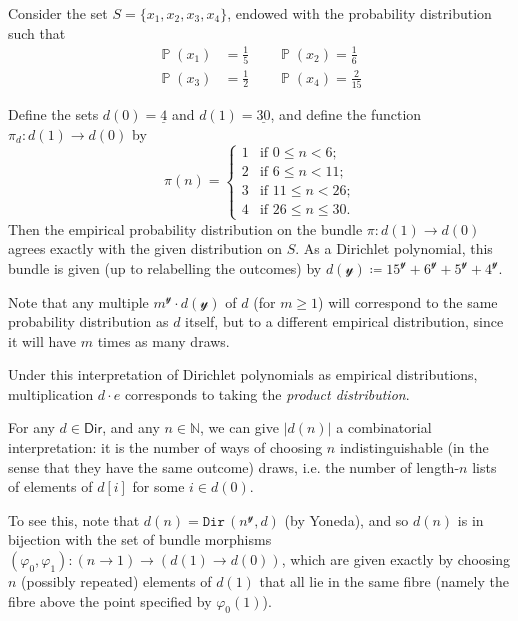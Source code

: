 \documentclass[11pt,fleqn]{article}
\renewcommand{\leq}{\leqslant}
\renewcommand{\geq}{\geqslant}
\newcommand{\yon}{\mathcal{y}}
\newcommand{\cat}[1]{\mathtt{#1}}
\newcommand{\rig}[1]{\mathsf{#1}}
\newcommand{\Dir}{\rig{Dir}}
\newcommand{\cDir}{\cat{Dir}}
\DeclareMathOperator{\prob}{\mathbb{P}}
\begin{document}
\begin{example}
  Consider the set $S=\{x_1,x_2,x_3,x_4\}$, endowed with the probability distribution such that
  \[
    \begin{aligned}
      \prob(x_1) &= \frac{1}{5}
      \qquad\prob(x_2) = \frac{1}{6}
    \\\prob(x_3) &= \frac{1}{2}
      \qquad\prob(x_4) = \frac{2}{15}
    \end{aligned}
  \]

  Define the sets $d(0)=\underline{4}$ and $d(1)=\underline{30}$, and define the function $\pi_d\colon d(1)\to d(0)$ by
  \[
    \pi(n) =
    \begin{cases}
      1 &\mbox{if $0\leq n<6$;}
    \\2 &\mbox{if $6\leq n<11$;}
    \\3 &\mbox{if $11\leq n<26$;}
    \\4 &\mbox{if $26\leq n\leq30$.}
    \end{cases}
  \]
  Then the empirical probability distribution on the bundle $\pi\colon d(1)\to d(0)$ agrees exactly with the given distribution on $S$.
  As a Dirichlet polynomial, this bundle is given (up to relabelling the outcomes) by $d(\yon)\coloneqq15^\yon+6^\yon+5^\yon+4^\yon$.

  Note that any multiple $m^\yon\cdot d(\yon)$ of $d$ (for $m\geq1$) will correspond to the same probability distribution as $d$ itself, but to a different empirical distribution, since it will have $m$ times as many draws.
\end{example}

Under this interpretation of Dirichlet polynomials as empirical distributions, multiplication $d\cdot e$ corresponds to taking the \emph{product distribution}.

\begin{remark}
  For any $d\in\Dir$, and any $n\in\mathbb{N}$, we can give $|d(n)|$ a combinatorial interpretation: it is the number of ways of choosing $n$ indistinguishable (in the sense that they have the same outcome) draws, i.e. the number of length-$n$ lists of elements of $d[i]$ for some $i\in d(0)$.

  To see this, note that $d(n)=\cDir\,(n^\yon,d)$ (by Yoneda), and so $d(n)$ is in bijection with the set of bundle morphisms $(\varphi_0,\varphi_1)\colon(n\to1)\to(d(1)\to d(0))$, which are given exactly by choosing $n$ (possibly repeated) elements of $d(1)$ that all lie in the same fibre (namely the fibre above the point specified by $\varphi_0(1)$).
\end{remark}
\end{document}
